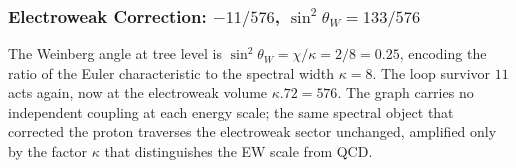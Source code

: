 \documentclass[11pt,a4paper]{book}
\def\cdot{.}%
\begin{document}
\begin{code}
\\
\>[0]\AgdaSpace{}%
\AgdaSymbol{=}\AgdaSpace{}%
\<%
\\
%
\\[\AgdaEmptyExtraSkip]%
\>[0]\<%
\\
\>[0]\AgdaSpace{}%
\AgdaSymbol{:}\AgdaSpace{}%
\AgdaSpace{}%
\AgdaSpace{}%
\AgdaSpace{}%
\AgdaOperator{\AgdaPrimitive{+}}\AgdaSpace{}%
\AgdaSpace{}%
\AgdaOperator{\AgdaPrimitive{+}}\AgdaSpace{}%
\<%
\\
\>[0]\AgdaSpace{}%
\AgdaSymbol{=}\AgdaSpace{}%
\<%
\\
%
\\[\AgdaEmptyExtraSkip]%
\>[0]\AgdaSpace{}%
\AgdaSymbol{:}\AgdaSpace{}%
\AgdaSpace{}%
\AgdaSpace{}%
\AgdaSpace{}%
\AgdaOperator{\AgdaPrimitive{*}}\AgdaSpace{}%
\AgdaSpace{}%
\AgdaOperator{\AgdaPrimitive{*}}\AgdaSpace{}%
\<%
\\
\>[0]\AgdaSpace{}%
\AgdaSymbol{=}\AgdaSpace{}%
\<%
\end{code}

\subsubsection*{Electroweak Correction: $-11/576$,\; $\sin^2\!\theta_W = 133/576$}

The Weinberg angle at tree level is $\sin^2\!\theta_W = \chi / \kappa = 2/8 = 0.25$,
encoding the ratio of the Euler characteristic to the spectral width $\kappa = 8$.
The loop survivor $11$ acts again, now at the electroweak volume $\kappa \cdot 72 = 576$.
The graph carries no independent coupling at each energy scale; the same spectral
object that corrected the proton traverses the electroweak sector unchanged, amplified
only by the factor $\kappa$ that distinguishes the EW scale from QCD.
\end{document}
